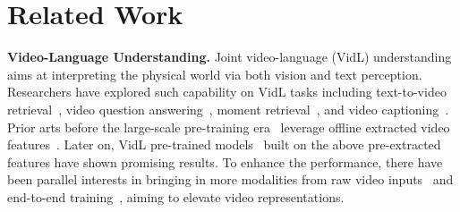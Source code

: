 \documentclass[10pt,twocolumn,letterpaper]{article}
\begin{document}
\section{Related Work}
\noindent \textbf{Video-Language Understanding.}
Joint video-language (VidL) understanding~\cite{li2021value,liu2020collaborative-expert,jiang2020dac,le2020hcr-vqa,gabeur2020mmt,patrick2021support-set,gan2022vlp} aims at interpreting the physical world via both vision and text perception. Researchers have explored such capability on VidL tasks including text-to-video retrieval~\cite{xu2016msrvtt,krishna2017dense-caption,rohrbach2015lsmdc,lei2020tvr,li2020hero}, video question answering~\cite{jang2017tgif-qa,xu2017msrvtt-qa,lei2018tvqa,lei2020tvqa+}, moment retrieval~\cite{hendricks2017local-moment,gao2017tall,krishna2017dense-caption,lei2020tvr}, and video captioning~\cite{wang2019vatex,zhou2018youcook2,xu2016msrvtt,rohrbach2015lsmdc}. Prior arts before the large-scale pre-training era~\cite{ gao2018motion,zhang2018video-text,lei2021qvhighlights, fan2019heterogeneous,le2020hcr-vqa,lei2020tvqa+} leverage offline extracted video features~\cite{kay2017kinetics,wang2016temporal, carreira2017quo, xie2018rethinking,feichtenhofer2019slowfast,deng2009imagenet,he2016resnet,krishna2017vg,anderson2018bottom}. Later on, VidL pre-trained models~\cite{sun2019videobert,zhu2020act-bert,li2020hero,miech2019howto100m} built on the above pre-extracted features have shown promising results. To enhance the performance, there have been parallel interests in bringing in more modalities from raw video inputs~\cite{gabeur2020mmt,rouditchenko2021avlnet,liu2021hit} and end-to-end training~\cite{miech2020end,lei2021clip-bert,zellers2021merlot,bain2021frozen}, aiming to elevate video representations.
\end{document}
